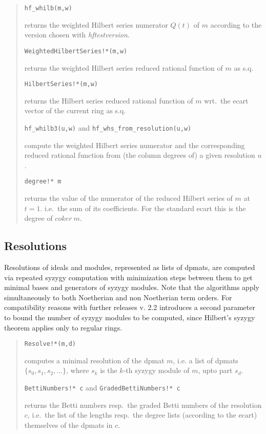 \documentclass[a4paper,11pt]{article}
\newcommand{\ind}[1]{{\em #1}\index{#1}}
\newcommand{\pbx}[1]{\mbox{}\hfill \parbox[t]{12cm}{#1} \pagebreak[3]}
\begin{document}
\begin{quote}
\verb|hf_whilb(m,w)|  

\pbx{returns the weighted Hilbert series numerator $Q(t)$ of $m$
according to the version chosen with \ind{hftestversion}.}

\verb|WeightedHilbertSeries!*(m,w)| 

\pbx{returns the weighted Hilbert series reduced rational function of
$m$ as s.q.} 

\verb|HilbertSeries!*(m,w)| 

\pbx{returns the Hilbert series reduced rational function of $m$ wrt.\
the ecart vector of the current ring as s.q.} 

\verb|hf_whilb3(u,w)| and \verb|hf_whs_from_resolution(u,w)|

\pbx{compute the weighted Hilbert series numerator and the
corresponding reduced rational function from (the column degrees of) a 
given resolution $u$.}  

\verb|degree!* m| 

\pbx{returns the value of the numerator of the reduced Hilbert series
of $m$ at $t=1$. i.e.\ the sum of its coefficients. For the standard
ecart this is the degree of $coker\ m$.} 
\end{quote}

\subsection{Resolutions}

Resolutions of ideals and modules, represented as lists of dpmats, are
computed via repeated syzygy computation with minimization steps
between them to get minimal bases and generators of syzygy
modules. Note that the algorithms apply simultaneously to both
Noetherian and non Noetherian term orders. For compatibility reasons
with further releases v. 2.2 introduces a second parameter to  
bound the number of syzygy modules to be computed, since Hilbert's
syzygy theorem applies only to regular rings.
\begin{quote}
\verb|Resolve!*(m,d)|  

\pbx{computes a minimal resolution of the dpmat $m$, i.e. a list of
dpmats $\{s_0, s_1, s_2,\ldots\}$, where $s_k$ is the $k$-th syzygy
module of $m$, upto part $s_d$.}

\verb|BettiNumbers!* c| and \verb|GradedBettiNumbers!* c|

\pbx{returns the Betti numbers resp.\ the graded Betti numbers of the
resolution $c$, i.e.\ the list of the lengths resp.\ the degree lists
(according to the ecart) themselves of the dpmats in $c$.}
\end{quote}
\end{document}
